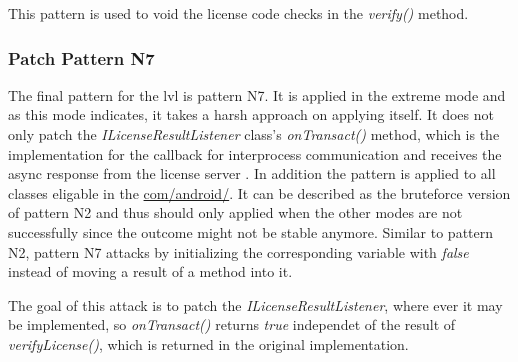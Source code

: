 This pattern is used to void the license code checks in the \textit{verify()} method.

\subsubsection{Patch Pattern N7}
The final pattern for the \gls{lvl} is pattern N7.
It is applied in the extreme mode and as this mode indicates, it takes a harsh approach on applying itself.
It does not only patch the \textit{ILicenseResultListener} class's \textit{onTransact()} method, which is the implementation for the callback for interprocess communication and receives the async response from the license server \cite{developersLicensingReference}.
In addition the pattern is applied to all classes eligable in the \url{com/android/}.
It can be described as the bruteforce version of pattern N2 and thus should only applied when the other modes are not successfully since the outcome might not be stable anymore.
\newline
Similar to pattern N2, pattern N7 attacks by initializing the corresponding variable with \textit{false} instead of moving a result of a method into it.
\newline

The goal of this attack is to patch the \textit{ILicenseResultListener}, where ever it may be implemented, so \textit{onTransact()} returns \textit{true} independet of the result of \textit{verifyLicense()}, which is returned in the original implementation.

